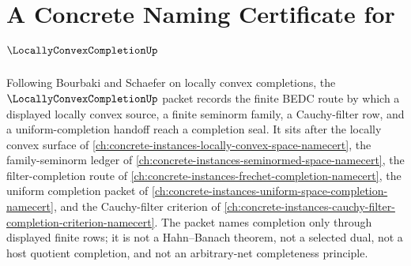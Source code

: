 \chapter{A Concrete Naming Certificate for $\LocallyConvexCompletionUp$}
\label{ch:concrete-instances-locally-convex-completion-namecert}

Following Bourbaki and Schaefer on locally convex completions, the $\LocallyConvexCompletionUp$ packet records the finite BEDC route by which a displayed locally convex source, a finite seminorm family, a Cauchy-filter row, and a uniform-completion handoff reach a completion seal. It sits after the locally convex surface of \autoref{ch:concrete-instances-locally-convex-space-namecert}, the family-seminorm ledger of \autoref{ch:concrete-instances-seminormed-space-namecert}, the filter-completion route of \autoref{ch:concrete-instances-frechet-completion-namecert}, the uniform completion packet of \autoref{ch:concrete-instances-uniform-space-completion-namecert}, and the Cauchy-filter criterion of \autoref{ch:concrete-instances-cauchy-filter-completion-criterion-namecert}. The packet names completion only through displayed finite rows; it is not a Hahn--Banach theorem, not a selected dual, not a host quotient completion, and not an arbitrary-net completeness principle.

